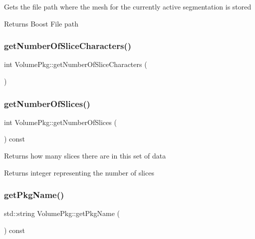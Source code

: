 Gets the file path where the mesh for the currently active segmentation is stored \begin{DoxyReturn}{Returns}
Boost File path 
\end{DoxyReturn}
\hypertarget{classVolumePkg_a0c42b917841dd44d5c9de641fadd2a94}{}\label{classVolumePkg_a0c42b917841dd44d5c9de641fadd2a94} 
\subsubsection{\texorpdfstring{get\+Number\+Of\+Slice\+Characters()}{getNumberOfSliceCharacters()}}
{\footnotesize\ttfamily int Volume\+Pkg\+::get\+Number\+Of\+Slice\+Characters (\begin{DoxyParamCaption}{ }\end{DoxyParamCaption})\hspace{0.3cm}{\ttfamily [private]}}

\hypertarget{classVolumePkg_a918b84ee059538166553c949188a8fd9}{}\label{classVolumePkg_a918b84ee059538166553c949188a8fd9} 
\subsubsection{\texorpdfstring{get\+Number\+Of\+Slices()}{getNumberOfSlices()}}
{\footnotesize\ttfamily int Volume\+Pkg\+::get\+Number\+Of\+Slices (\begin{DoxyParamCaption}{ }\end{DoxyParamCaption}) const}

Returns how many slices there are in this set of data \begin{DoxyReturn}{Returns}
integer representing the number of slices 
\end{DoxyReturn}
\hypertarget{classVolumePkg_a3c9253427cf985c1bd523d84c396677b}{}\label{classVolumePkg_a3c9253427cf985c1bd523d84c396677b} 
\subsubsection{\texorpdfstring{get\+Pkg\+Name()}{getPkgName()}}
{\footnotesize\ttfamily std\+::string Volume\+Pkg\+::get\+Pkg\+Name (\begin{DoxyParamCaption}{ }\end{DoxyParamCaption}) const}

